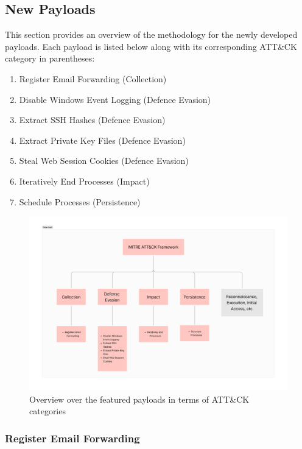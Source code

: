 \subsection{New Payloads}

This section provides an overview of the methodology for the newly developed payloads. Each payload is listed below along with its corresponding ATT\&CK category in parentheses:
\begin{enumerate}
    \item Register Email Forwarding (Collection)
    \item Disable Windows Event Logging (Defence Evasion)
    \item Extract SSH Hashes (Defence Evasion)
    \item Extract Private Key Files (Defence Evasion)
    \item Steal Web Session Cookies (Defence Evasion)
    \item Iteratively End Processes (Impact)
    \item Schedule Processes (Persistence)
\end{enumerate}


\begin{figure}[H]
    \centering
    \includegraphics[width=1\linewidth]{visuals/payloads_overview.png}
    \caption{Overview over the featured payloads in terms of ATT\&CK categories}
\end{figure}





\subsubsection{Register Email Forwarding}

